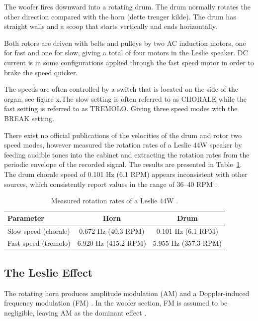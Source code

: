 The woofer fires downward into a rotating drum. The drum normally rotates the other direction compared with the horn (dette trenger kilde). The drum has straight walls and a scoop that starts vertically and ends horizontally.

Both rotors are driven with belts and pulleys by two AC induction motors, one for fast and one for slow, giving a total of four motors in the Leslie speaker. DC current is in some configurations applied through the fast speed motor in order to brake the speed quicker.

The speeds are often controlled by a switch that is located on the side of the organ, see figure x.The slow setting is often referred to as CHORALE while the fast setting is referred to as TREMOLO. Giving three speed modes with the BREAK setting.

There exist no official publications of the velocities of the drum and rotor
two speed modes, however \cite{Herrera2009} measured
the rotation rates of a Leslie 44W speaker by feeding audible tones into
the cabinet and extracting the rotation rates from the periodic envelope
of the recorded signal. The results are presented in
Table~\ref{tab:leslie_params}. The drum chorale speed of 0.101 Hz (6.1 RPM)
appears inconsistent with other sources, which consistently report values
in the range of 36--40 RPM \cite{HammondWiki}.

\begin{table}[h]
	\centering
	\begin{tabular}{lcc}
		\hline
		\textbf{Parameter}   & \textbf{Horn}        & \textbf{Drum}        \\
		\hline
		Slow speed (chorale) & 0.672 Hz (40.3 RPM)  & 0.101 Hz (6.1 RPM)   \\
		Fast speed (tremolo) & 6.920 Hz (415.2 RPM) & 5.955 Hz (357.3 RPM) \\
		\hline
	\end{tabular}
	\caption{Measured rotation rates of a Leslie 44W \cite{Herrera2009}.}
	\label{tab:leslie_params}
\end{table}


\subsection{The Leslie Effect}

The rotating horn produces amplitude modulation (AM) and a Doppler-induced frequency modulation (FM) \cite{kronland2008}. In the woofer section, FM is assumed to be negligible, leaving AM as the dominant effect \cite{kronland2008}.

